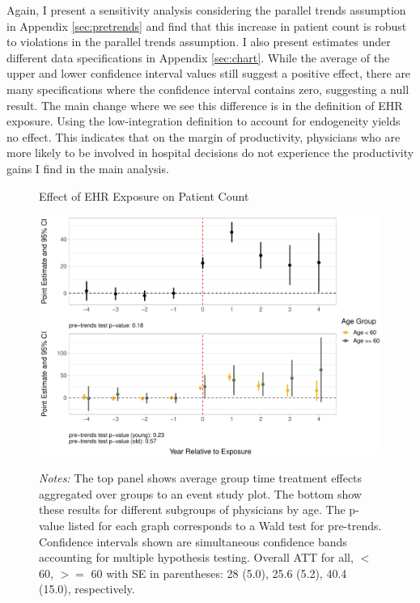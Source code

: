 \documentclass[12pt]{article}
\begin{document}
Again, I present a sensitivity analysis considering the parallel trends assumption in Appendix \ref{sec:pretrends} and find that this increase in patient count is robust to violations in the parallel trends assumption. I also present estimates under different data specifications in Appendix \ref{sec:chart}. While the average of the upper and lower confidence interval values still suggest a positive effect, there are many specifications where the confidence interval contains zero, suggesting a null result. The main change where we see this difference is in the definition of EHR exposure. Using the low-integration definition to account for endogeneity yields no effect. This indicates that on the margin of productivity, physicians who are more likely to be involved in hospital decisions do not experience the productivity gains I find in the main analysis. 

\begin{figure}[ht]
    \centering
    \captionsetup{width=.85\linewidth}
    \caption{Effect of EHR Exposure on Patient Count}
    \includegraphics[scale=.6]{Objects/patient_plot.pdf}
    \label{fig:patient}
    \vspace{2mm}
    \caption*{\footnotesize{\textit{Notes:} The top panel shows average group time treatment effects aggregated over groups to an event study plot. The bottom show these results for different subgroups of physicians by age. The p-value listed for each graph corresponds to a Wald test for pre-trends. Confidence intervals shown are simultaneous confidence bands accounting for multiple hypothesis testing. Overall ATT for all, $<$ 60, $>=$ 60 with SE in parentheses: 28 (5.0), 25.6 (5.2), 40.4 (15.0), respectively.}}
\end{figure}
\end{document}
